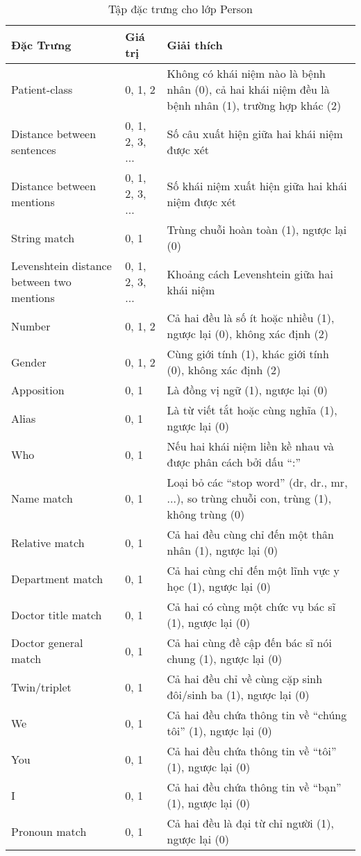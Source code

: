 \begin{table}[th]
\centering{}
\caption{Tập đặc trưng cho lớp Person \label{tab:PersonFeatures}}
\footnotesize\sffamily

\begin{tabularx}{\textwidth}{@{}P{\raggedright}{0.3}lL@{}}
\toprule 
\textbf{Đặc Trưng} & \textbf{Giá trị} & \textbf{Giải thích}\\
\midrule
Patient-class & 0, 1, 2 & Không có khái niệm nào là bệnh nhân (0), cả hai khái niệm đều là bệnh nhân (1), trường hợp khác (2)\\
Distance between sentences & 0, 1, 2, 3, ... & Số câu xuất hiện giữa hai khái niệm được xét\\
Distance between mentions & 0, 1, 2, 3, ... & Số khái niệm xuất hiện giữa hai khái niệm được xét\\
String match & 0, 1 & Trùng chuỗi hoàn toàn (1), ngược lại (0)\\
Levenshtein distance between two mentions & 0, 1, 2, 3, ... & Khoảng cách Levenshtein giữa hai khái niệm\\
Number & 0, 1, 2 & Cả hai đều là số ít hoặc nhiều (1), ngược lại (0), không xác định (2)\\
Gender & 0, 1, 2 & Cùng giới tính (1), khác giới tính (0), không xác định (2)\\
Apposition & 0, 1 & Là đồng vị ngữ (1), ngược lại (0)\\
Alias & 0, 1 & Là từ viết tắt hoặc cùng nghĩa (1), ngược lại (0)\\
Who & 0, 1 & Nếu hai khái niệm liền kề nhau và được phân cách bởi dấu ``:''\\
Name match & 0, 1 & Loại bỏ các	``stop word'' (dr, dr., mr, ...), so trùng chuỗi con, trùng (1), không trùng (0)\\
Relative match & 0, 1 & Cả hai đều cùng chỉ đến một thân nhân (1), ngược lại (0)\\
Department match & 0, 1 & Cả hai cùng chỉ đến một lĩnh vực y học (1), ngược lại (0)\\
Doctor title match & 0, 1 & Cả hai có cùng một chức vụ bác sĩ (1), ngược lại (0)\\
Doctor general match & 0, 1 & Cả hai cùng đề cập đến bác sĩ nói chung (1), ngược lại (0)\\
Twin/triplet & 0, 1 & Cả hai đều chỉ về cùng cặp sinh đôi/sinh ba (1), ngược lại (0)\\
We & 0, 1 & Cả hai đều chứa thông tin về ``chúng tôi'' (1), ngược lại (0)\\
You & 0, 1 & Cả hai đều chứa thông tin về ``tôi'' (1), ngược lại (0)\\
I & 0, 1 & Cả hai đều chứa thông tin về ``bạn'' (1), ngược lại (0)\\
Pronoun match & 0, 1 & Cả hai đều là đại từ chỉ người (1), ngược lại (0)\\
\bottomrule
\end{tabularx}
\end{table}

